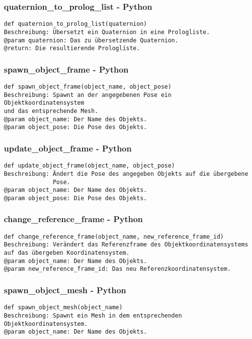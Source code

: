 \documentclass{suturo}
\begin{document}
\subsubsection{quaternion\_to\_prolog\_list - Python}
\begin{verbatim}
def quaternion_to_prolog_list(quaternion)
Beschreibung: Übersetzt ein Quaternion in eine Prologliste.
@param quaternion: Das zu übersetzende Quaternion.
@return: Die resultierende Prologliste.
\end{verbatim}

\subsubsection{spawn\_object\_frame - Python}
\begin{verbatim}
def spawn_object_frame(object_name, object_pose)
Beschreibung: Spawnt an der angegebenen Pose ein Objektkoordinatensystem 
und das entsprechende Mesh.
@param object_name: Der Name des Objekts.
@param object_pose: Die Pose des Objekts.
\end{verbatim}

\subsubsection{update\_object\_frame - Python}
\begin{verbatim}
def update_object_frame(object_name, object_pose)
Beschreibung: Ändert die Pose des angegeben Objekts auf die übergebene
              Pose.
@param object_name: Der Name des Objekts.
@param object_pose: Die Pose des Objekts.
\end{verbatim}

\subsubsection{change\_reference\_frame - Python}
\begin{verbatim}
def change_reference_frame(object_name, new_reference_frame_id)
Beschreibung: Verändert das Referenzframe des Objektkoordinatensystems 
auf das übergeben Koordinatensystem.
@param object_name: Der Name des Objekts.
@param new_reference_frame_id: Das neu Referenzkoordinatensystem.
\end{verbatim}

\subsubsection{spawn\_object\_mesh - Python}
\begin{verbatim}
def spawn_object_mesh(object_name)
Beschreibung: Spawnt ein Mesh in dem entsprechenden Objektkoordinatensystem.
@param object_name: Der Name des Objekts.
\end{verbatim}
\end{document}
